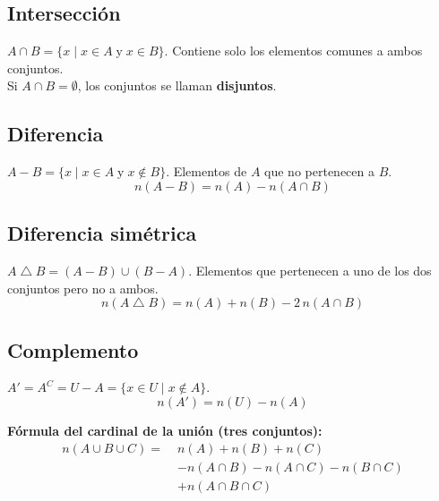 \subsection{Intersecci\'on}

\begin{cajadef}
  $A \cap B = \{x \mid x \in A \;\text{y}\; x \in B\}$. Contiene solo los
  elementos comunes a ambos conjuntos.\\
  Si $A \cap B = \emptyset$, los conjuntos se llaman \textbf{disjuntos}.
\end{cajadef}

\subsection{Diferencia}

\begin{cajadef}
  $A - B = \{x \mid x \in A \;\text{y}\; x \notin B\}$. Elementos de $A$ que
  no pertenecen a $B$.
  \[
    n(A - B) = n(A) - n(A \cap B)
  \]
\end{cajadef}

\subsection{Diferencia sim\'etrica}

\begin{cajadef}
  $A \mathbin{\triangle} B = (A - B) \cup (B - A)$. Elementos que pertenecen
  a uno de los dos conjuntos pero no a ambos.
  \[
    n(A \mathbin{\triangle} B) = n(A) + n(B) - 2\,n(A \cap B)
  \]
\end{cajadef}

\subsection{Complemento}

\begin{cajadef}
  $A' = A^{C} = U - A = \{x \in U \mid x \notin A\}$.
  \[
    n(A') = n(U) - n(A)
  \]
\end{cajadef}

\begin{cajaformula}
  \textbf{Fórmula del cardinal de la unión (tres conjuntos):}
  \begin{align*}
    n(A \cup B \cup C) =\;& n(A) + n(B) + n(C) \\
                          &- n(A \cap B) - n(A \cap C) - n(B \cap C) \\
                          &+ n(A \cap B \cap C)
  \end{align*}
\end{cajaformula}

